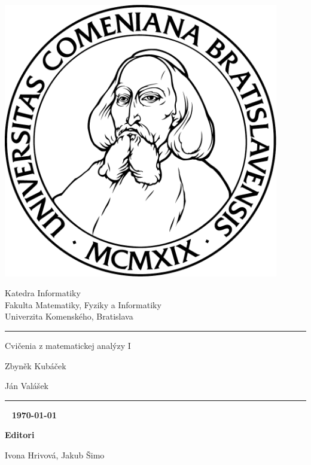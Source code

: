 \thispagestyle{empty}
\begin{minipage}{0.25\textwidth}
  \includegraphics[width=0.9\textwidth]{img/komlogo-new}
\end{minipage}
\begin{minipage}{0.69\textwidth}
  \begin{center}
    \sc Katedra Informatiky \\
    Fakulta Matematiky, Fyziky a Informatiky \\
    Univerzita Komenského, Bratislava
  \end{center}
\end{minipage}
\vfill
\begin{center}
  \begin{minipage}{0.8\textwidth}
    \hrule
    \bigskip\bigskip
    \centerline{\LARGE\sc Cvičenia z matematickej analýzy I}
    \bigskip\bigskip
    \centerline{\large\sc Zbyněk Kubáček}
    \bigskip
    \centerline{\large\sc Ján Valášek}
    \bigskip\bigskip
    \hrule
  \end{minipage}
\end{center}
\vfill
{~}
\hfill {\bf\today}

\hfill \textbf{Editori}

\hfill Ivona Hrivová, Jakub Šimo
\eject %
